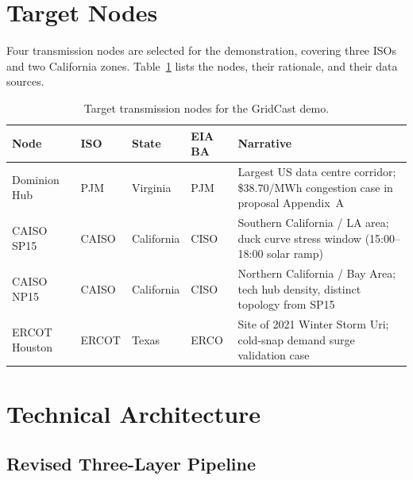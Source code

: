 \documentclass[10pt,letterpaper]{article}
\begin{document}
\section{Target Nodes}

Four transmission nodes are selected for the demonstration, covering three ISOs and two
California zones. Table~\ref{tab:nodes} lists the nodes, their rationale, and their
data sources.

\begin{table}[H]
\centering
\caption{Target transmission nodes for the GridCast demo.}
\label{tab:nodes}
\renewcommand{\arraystretch}{1.3}
\begin{tabularx}{\linewidth}{@{}llllX@{}}
\toprule
\textbf{Node} & \textbf{ISO} & \textbf{State} & \textbf{EIA BA} & \textbf{Narrative} \\
\midrule
Dominion Hub   & PJM    & Virginia       & PJM  & Largest US data centre corridor;
                                                   \$38.70/MWh congestion case in
                                                   proposal Appendix~A \\
CAISO SP15     & CAISO  & California     & CISO & Southern California / LA area;
                                                   duck curve stress window
                                                   (15:00--18:00 solar ramp) \\
CAISO NP15     & CAISO  & California     & CISO & Northern California / Bay Area;
                                                   tech hub density, distinct
                                                   topology from SP15 \\
ERCOT Houston  & ERCOT  & Texas          & ERCO & Site of 2021 Winter Storm Uri;
                                                   cold-snap demand surge validation
                                                   case \\
\bottomrule
\end{tabularx}
\end{table}

\section{Technical Architecture}

\subsection{Revised Three-Layer Pipeline}
\end{document}
